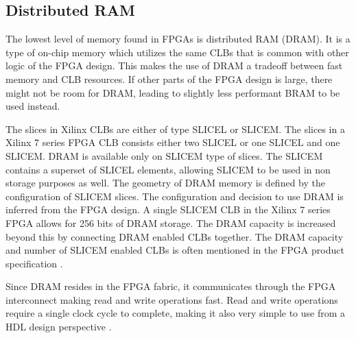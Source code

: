 \documentclass[12pt]{report}
\begin{document}
\subsection{Distributed RAM}
The lowest level of memory found in FPGAs is distributed RAM (DRAM). It is a type of on-chip memory which utilizes the same CLBs that is common with other logic of the FPGA design. This makes the use of DRAM a tradeoff between fast memory and CLB resources. If other parts of the FPGA design is large, there might not be room for DRAM, leading to slightly less performant BRAM to be used instead.
\par
The slices in Xilinx CLBs are either of type SLICEL or SLICEM. The slices in a Xilinx 7 series FPGA CLB consists either two SLICEL or one SLICEL and one SLICEM. DRAM is available only on SLICEM type of slices. The SLICEM contains a superset of SLICEL elements, allowing SLICEM to be used in non storage purposes as well. The geometry of DRAM memory is defined by the configuration of SLICEM slices. The configuration and decision to use DRAM is inferred from the FPGA design. A single SLICEM CLB in the Xilinx 7 series FPGA allows for 256 bits of DRAM storage. The DRAM capacity is increased beyond this by connecting DRAM enabled CLBs together. The DRAM capacity and number of SLICEM enabled CLBs is often mentioned in the FPGA product specification \citep{XilMemMan}. 
\par
Since DRAM resides in the FPGA fabric, it communicates through the FPGA interconnect making read and write operations fast. Read and write operations require a single clock cycle to complete, making it also very simple to use from a HDL design perspective \citep{XilMemMan}.  
\end{document}
